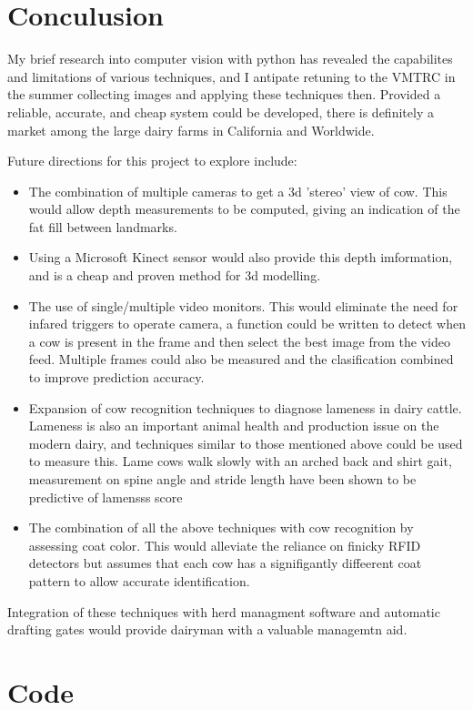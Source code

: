 \documentclass[11pt]{article}
\begin{document}
\section{Conculusion}
	My brief research into computer vision with python has revealed the capabilites and limitations of various techniques, and I antipate retuning to the VMTRC in the summer collecting images and applying these techniques then.
	Provided a reliable, accurate, and cheap system could be developed, there is definitely a market among the large dairy farms in California and Worldwide.

	Future directions for this project to explore include:
	\begin{itemize}
		\item The combination of multiple cameras to get a 3d 'stereo' view of cow. This would allow depth measurements to be computed, giving an indication of the fat fill between landmarks.
		\item Using a Microsoft Kinect sensor would also provide this depth imformation, and is a cheap and proven method for 3d modelling.
		\item The use of single/multiple video monitors. This would eliminate the need for infared triggers to operate camera, a function could be written to detect when a cow is present in the frame and then select the best image from the video feed. Multiple frames could also be measured and the clasification combined to improve prediction accuracy.
		\item Expansion of cow recognition techniques to diagnose lameness in dairy cattle. Lameness is also an important animal health and production issue on the modern dairy, and techniques similar to those mentioned above could be used to measure this.
			Lame cows walk slowly with an arched back and shirt gait, measurement on spine angle and stride length have been shown to be predictive of lamensss score\cite{Viazzi2013,Pluk2012}
		\item The combination of all the above techniques with cow recognition by assessing coat color. This would alleviate the reliance on finicky RFID detectors but assumes that each cow has a signifigantly diffeerent coat pattern to allow accurate identification.
	\end{itemize}

	Integration of these techniques with herd managment software and automatic drafting gates would provide dairyman with a valuable managemtn aid.

	\newpage

\section{Code}
	

\newpage


\end{document}
